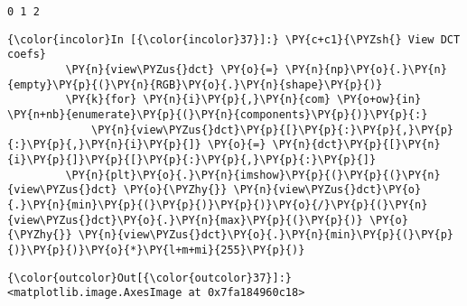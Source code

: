     \begin{Verbatim}[commandchars=\\\{\}]
0 1 2 
    \end{Verbatim}

    \begin{Verbatim}[commandchars=\\\{\}]
{\color{incolor}In [{\color{incolor}37}]:} \PY{c+c1}{\PYZsh{} View DCT coefs}
         \PY{n}{view\PYZus{}dct} \PY{o}{=} \PY{n}{np}\PY{o}{.}\PY{n}{empty}\PY{p}{(}\PY{n}{RGB}\PY{o}{.}\PY{n}{shape}\PY{p}{)}
         \PY{k}{for} \PY{n}{i}\PY{p}{,}\PY{n}{com} \PY{o+ow}{in} \PY{n+nb}{enumerate}\PY{p}{(}\PY{n}{components}\PY{p}{)}\PY{p}{:}
             \PY{n}{view\PYZus{}dct}\PY{p}{[}\PY{p}{:}\PY{p}{,}\PY{p}{:}\PY{p}{,}\PY{n}{i}\PY{p}{]} \PY{o}{=} \PY{n}{dct}\PY{p}{[}\PY{n}{i}\PY{p}{]}\PY{p}{[}\PY{p}{:}\PY{p}{,}\PY{p}{:}\PY{p}{]}
         \PY{n}{plt}\PY{o}{.}\PY{n}{imshow}\PY{p}{(}\PY{p}{(}\PY{n}{view\PYZus{}dct} \PY{o}{\PYZhy{}} \PY{n}{view\PYZus{}dct}\PY{o}{.}\PY{n}{min}\PY{p}{(}\PY{p}{)}\PY{p}{)}\PY{o}{/}\PY{p}{(}\PY{n}{view\PYZus{}dct}\PY{o}{.}\PY{n}{max}\PY{p}{(}\PY{p}{)} \PY{o}{\PYZhy{}} \PY{n}{view\PYZus{}dct}\PY{o}{.}\PY{n}{min}\PY{p}{(}\PY{p}{)}\PY{p}{)}\PY{o}{*}\PY{l+m+mi}{255}\PY{p}{)}
\end{Verbatim}


\begin{Verbatim}[commandchars=\\\{\}]
{\color{outcolor}Out[{\color{outcolor}37}]:} <matplotlib.image.AxesImage at 0x7fa184960c18>
\end{Verbatim}
            
    \begin{center}
    \end{center}
    { \hspace*{\fill} \\}
    

